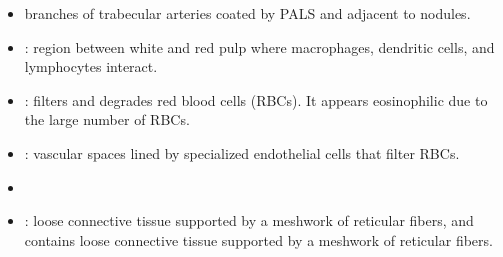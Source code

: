 \begin{itemize}
\begin{multicols}{2}
\begin{itemize}
    \item {} branches of trabecular arteries coated by PALS and adjacent to nodules.
    
    \begin{center}
    \end{center}
    
    \item {}: region between white and red pulp where macrophages, dendritic cells, and lymphocytes interact.
    
    \begin{center}
    \end{center}
    
    \item {}: filters and degrades red blood cells (RBCs). It appears eosinophilic due to the large number of RBCs.
    
    \begin{center}
    \end{center}
    
    \newpage

    \item {}: vascular spaces lined by specialized endothelial cells that filter RBCs. 
    
    \begin{center}
    \end{center}
    
    \item {}
    
    \begin{center}
    \end{center}

    \item {}: loose connective tissue supported by a meshwork of reticular fibers, and contains loose connective tissue supported by a meshwork of reticular fibers.
    

\end{itemize}
\end{multicols}
\end{itemize}
